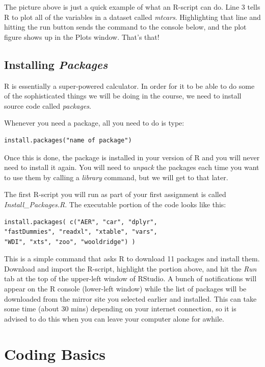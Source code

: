 \documentclass[
]{book}
\begin{document}
The picture above is just a quick example of what an R-script can do. Line 3 tells R to plot all of the variables in a dataset called \emph{mtcars}. Highlighting that line and hitting the run button sends the command to the console below, and the plot figure shows up in the Plots window. That's that!

\hypertarget{installing-packages}{%
\subsection{\texorpdfstring{Installing \emph{Packages}}{Installing Packages}}\label{installing-packages}}

R is essentially a super-powered calculator. In order for it to be able to do some of the sophisticated things we will be doing in the course, we need to install source code called \emph{packages}.

Whenever you need a package, all you need to do is type:

\begin{verbatim}
install.packages("name of package")
\end{verbatim}

Once this is done, the package is installed in your version of R and you will never need to install it again. You will need to \emph{unpack} the packages each time you want to use them by calling a \emph{library} command, but we will get to that later.

The first R-script you will run as part of your first assignment is called \emph{Install\_Packages.R}. The executable portion of the code looks like this:

\begin{verbatim}
install.packages( c("AER", "car", "dplyr", 
"fastDummies", "readxl", "xtable", "vars",
"WDI", "xts", "zoo", "wooldridge") )
\end{verbatim}

This is a simple command that asks R to download 11 packages and install them. Download and import the R-script, highlight the portion above, and hit the \emph{Run} tab at the top of the upper-left window of RStudio. A bunch of notifications will appear on the R console (lower-left window) while the list of packages will be downloaded from the mirror site you selected earlier and installed. This can take some time (about 30 mins) depending on your internet connection, so it is advised to do this when you can leave your computer alone for awhile.

\hypertarget{coding-basics}{%
\section{Coding Basics}\label{coding-basics}}
\end{document}
